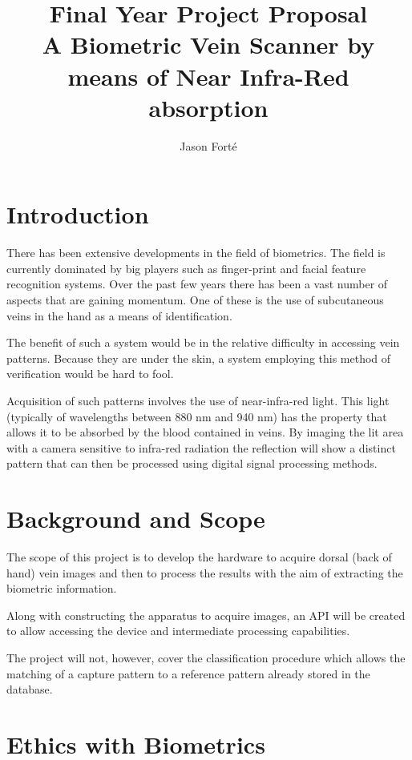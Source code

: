 \documentclass[10pt,a4paper,twoside,noindent]{report}
\author{Jason Fort\'{e}}
\title{Final Year Project Proposal\\A Biometric Vein Scanner by means of Near Infra-Red absorption}
\begin{document}
\maketitle

\section*{Introduction}
\thispagestyle{empty}

There has been extensive developments in the field of biometrics. The field is currently dominated by big players such as finger-print and facial feature recognition systems. Over the past few years there has been a vast number of aspects that are gaining momentum. One of these is the use of subcutaneous veins in the hand as a means of identification.

The benefit of such a system would be in the relative difficulty in accessing vein patterns. Because they are under the skin, a system employing this method of verification would be hard to fool.

Acquisition of such patterns involves the use of near-infra-red light. This light (typically of wavelengths between 880 nm and 940 nm) has the property that allows it to be absorbed by the blood contained in veins. By imaging the lit area with a camera sensitive to infra-red radiation the reflection will show a distinct pattern that can then be processed using digital signal processing methods.

\section*{Background and Scope}

The scope of this project is to develop the hardware to acquire dorsal (back of hand) vein images and then to process the results with the aim of extracting the biometric information.

Along with constructing the apparatus to acquire images, an API will be created to allow accessing the device and intermediate processing capabilities.

The project will not, however, cover the classification procedure which allows the matching of a capture pattern to a reference pattern already stored in the database.

\section*{Ethics with Biometrics}
\end{document}
